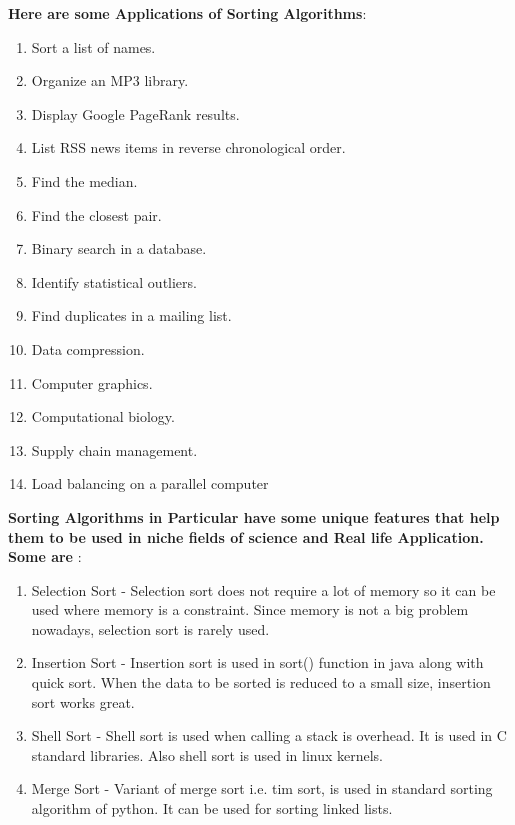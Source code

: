 \documentclass[11pt]{article}
\begin{document}
\begin{enumerate}
	      \textbf{Here are some Applications of Sorting Algorithms}:
	      \begin{enumerate}
		      \item Sort a list of names.
		      \item Organize an MP3 library.
		      \item Display Google PageRank results.
		      \item List RSS news items in reverse chronological order.
		      \item Find the median.
		      \item Find the closest pair.
		      \item Binary search in a database.
		      \item Identify statistical outliers.
		      \item Find duplicates in a mailing list.
		      \item Data compression.
		      \item Computer graphics.
		      \item Computational biology.
		      \item Supply chain management.
		      \item Load balancing on a parallel computer
	      \end{enumerate}

	      \textbf{Sorting Algorithms in Particular have some unique features that help them to be used in niche fields of science and Real life Application. Some are} :
	      \begin{enumerate}
		      \item Selection Sort - Selection sort does not require a lot of memory so it can be used where memory is a constraint. Since memory is not a big problem nowadays, selection sort is rarely used.

		      \item Insertion Sort - Insertion sort is used in sort() function in java along with quick sort. When the data to be sorted is reduced to a small size, insertion sort works great.

		      \item Shell Sort - Shell sort is used when calling a stack is overhead. It is used in C standard libraries. Also shell sort is used in linux kernels.

		      \item Merge Sort - Variant of merge sort i.e. tim sort, is used in standard sorting algorithm of python. It can be used for sorting linked lists.


\end{enumerate}
\end{enumerate}
\end{document}
